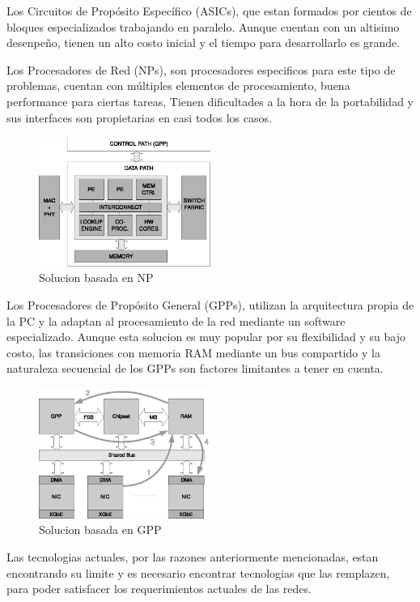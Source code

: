 Los Circuitos de Propósito Específico (ASICs), que estan formados por cientos de bloques especializados trabajando en paralelo. Aunque cuentan con un altisimo desenpeño, tienen un alto costo inicial y el tiempo para desarrollarlo es grande.

Los Procesadores de Red (NPs), son procesadores especificos para este tipo de problemas, cuentan con múltiples elementos de procesamiento, buena performance para ciertas tareas, Tienen dificultades a la hora de la portabilidad y sus interfaces son propietarias en casi todos los casos.
\begin{figure}[h]
  \centering
      \includegraphics[width=0.5\textwidth]{1-introduccion/graf/NP_based.eps}
  \caption{Solucion basada en NP}
  \label{fig:diseno}
\end{figure}
\newpage

Los Procesadores de Propósito General (GPPs), utilizan la arquitectura propia de la PC y la adaptan al procesamiento de la red mediante un software especializado. Aunque esta solucion es muy popular por su flexibilidad y su bajo costo, las transiciones con memoria RAM mediante un bus compartido y la naturaleza secuencial de los GPPs son factores limitantes a tener en cuenta. 
 \begin{figure}[h]
  \centering
      \includegraphics[width=0.5\textwidth]{1-introduccion/graf/GPP_based.eps}
  \caption{Solucion basada en GPP}
  \label{fig:diseno}
\end{figure}

Las tecnologias actuales, por las razones anteriormente mencionadas, estan encontrando su limite y es necesario encontrar tecnologias que las remplazen, para poder satisfacer los requerimientos actuales de las redes. 


